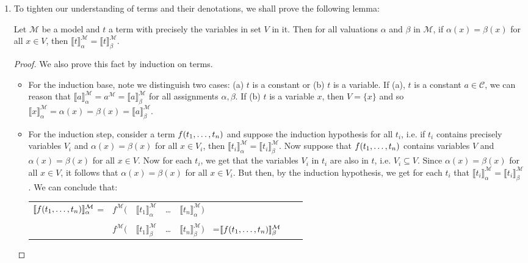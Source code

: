 \begin{enumerate}[\thesection.1]
		\item To tighten our understanding of terms and their denotations, we shall prove the following lemma:
		\begin{lemma}
		Let $\mathcal{M}$ be a model and $t$ a term with precisely the variables in set $V$ in it. Then for all valuations $\alpha$ and $\beta$ in $\mathcal{M}$, if $\alpha(x)=\beta(x)$ for all $x\in V$, then $\llbracket t\rrbracket_\alpha^\mathcal{M}=\llbracket t\rrbracket_\beta^\mathcal{M}$.
		\end{lemma}
		\begin{proof}
		We also prove this fact by induction on terms. 
		
		\begin{itemize}
		
		\item For the induction base, note we distinguish two cases: (a) $t$ is a constant or (b) $t$ is a variable. If (a), $t$ is a constant $a\in\mathcal{C}$, we can reason that $\llbracket a\rrbracket^\mathcal{M}_\alpha=a^\mathcal{M}=\llbracket a\rrbracket^\mathcal{M}_\beta$ for all assignments $\alpha,\beta$. If (b) $t$ is a variable $x$, then $V=\{x\}$ and so $\llbracket x\rrbracket^\mathcal{M}_\alpha=\alpha(x)=\beta(x)=\llbracket a\rrbracket^\mathcal{M}_\beta$. 
		
		\item For the induction step, consider a term $f(t_1, \mathellipsis, t_n)$ and suppose the induction hypothesis for all $t_i$, i.e. if $t_i$ contains precisely variables $V_i$ and $\alpha(x)=\beta(x)$ for all $x\in V_i$, then $\llbracket t_i\rrbracket_\alpha^\mathcal{M}=\llbracket t_i\rrbracket_\beta^\mathcal{M}$. Now suppose that $f(t_1, \mathellipsis, t_n)$ contains variables $V$ and $\alpha(x)=\beta(x)$ for all $x\in V$. Now for each $t_i$, we get that the variables $V_i$ in $t_i$ are also in $t$, i.e. $V_i\subseteq V$. Since $\alpha(x)=\beta(x)$ for all $x\in V$, it follows that $\alpha(x)=\beta(x)$ for all $x\in V_i$. But then, by the induction hypothesis, we get for each $t_i$ that $\llbracket t_i\rrbracket_\alpha^\mathcal{M}=\llbracket t_i\rrbracket_\beta^\mathcal{M}$. We can conclude that:
	\begin{center}
		\begin{tabular}{c c c c c c ll}
		$\llbracket f(t_1, \mathellipsis, t_n)\rrbracket^\mathcal{M}_\alpha$ = & $f^\mathcal{M}($ & $\llbracket t_1\rrbracket^\mathcal{M}_\alpha$ &  \dots & $\llbracket t_n\rrbracket^\mathcal{M}_\alpha)$\\
		 & & \rotatebox{90}{=} & & \rotatebox{90}{=} &\\
		& $f^\mathcal{M}($ & $\llbracket t_1\rrbracket^\mathcal{M}_\beta$ &  \dots & $\llbracket t_n\rrbracket^\mathcal{M}_\beta)$&=$\llbracket f(t_1, \mathellipsis, t_n)\rrbracket^\mathcal{M}_\beta$ \\
		\end{tabular}
		\end{center}
		

\end{itemize}
\end{proof}
\end{enumerate}

